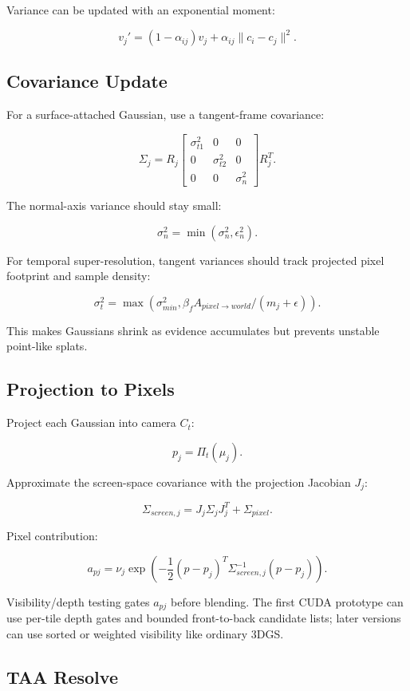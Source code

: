 \documentclass[11pt]{article}
\begin{document}
Variance can be updated with an exponential moment:

\[
  v_j' =
  (1-\alpha_{ij})v_j
  + \alpha_{ij}\|c_i-c_j\|^2.
\]

\subsection{Covariance Update}

For a surface-attached Gaussian, use a tangent-frame covariance:

\[
  \Sigma_j =
  R_j
  \begin{bmatrix}
    \sigma_{t1}^2 & 0 & 0\\
    0 & \sigma_{t2}^2 & 0\\
    0 & 0 & \sigma_n^2
  \end{bmatrix}
  R_j^T.
\]

The normal-axis variance should stay small:

\[
  \sigma_n^2 = \min(\sigma_n^2, \epsilon_n^2).
\]

For temporal super-resolution, tangent variances should track projected pixel
footprint and sample density:

\[
  \sigma_t^2 =
  \max(\sigma_{min}^2,
       \beta_f A_{pixel\rightarrow world}
       /(m_j+\epsilon)).
\]

This makes Gaussians shrink as evidence accumulates but prevents unstable
point-like splats.

\subsection{Projection to Pixels}

Project each Gaussian into camera $C_t$:

\[
  p_j = \Pi_t(\mu_j).
\]

Approximate the screen-space covariance with the projection Jacobian $J_j$:

\[
  \Sigma_{screen,j} = J_j\Sigma_jJ_j^T + \Sigma_{pixel}.
\]

Pixel contribution:

\[
  a_{pj} =
  \nu_j
  \exp\left(
    -\frac{1}{2}(p-p_j)^T
    \Sigma_{screen,j}^{-1}
    (p-p_j)
  \right).
\]

Visibility/depth testing gates $a_{pj}$ before blending. The first CUDA
prototype can use per-tile depth gates and bounded front-to-back candidate
lists; later versions can use sorted or weighted visibility like ordinary 3DGS.

\subsection{TAA Resolve}
\end{document}
